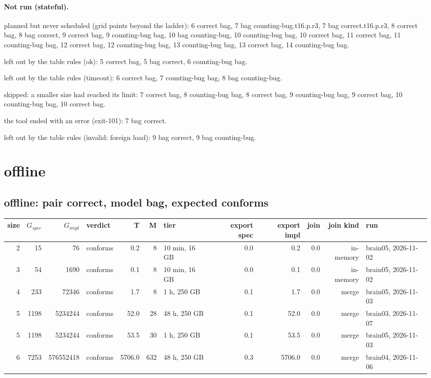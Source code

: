 \documentclass[10pt]{article}
\begin{document}
\paragraph{Not run (stateful).}
planned but never scheduled (grid points beyond the ladder): 6 correct bag, 7 bag counting-bug.t16.p.r3, 7 bag correct.t16.p.r3, 8 correct bag, 8 bag correct, 9 correct bag, 9 counting-bug bag, 10 bag counting-bug, 10 counting-bug bag, 10 correct bag, 11 correct bag, 11 counting-bug bag, 12 correct bag, 12 counting-bug bag, 13 counting-bug bag, 13 correct bag, 14 counting-bug bag.\par
left out by the table rules (ok): 5 correct bag, 5 bag correct, 6 counting-bug bag.\par
left out by the table rules (timeout): 6 correct bag, 7 counting-bug bag, 8 bag counting-bug.\par
skipped: a smaller size had reached its limit: 7 correct bag, 8 counting-bug bag, 8 correct bag, 9 counting-bug bag, 9 correct bag, 10 counting-bug bag, 10 correct bag.\par
the tool ended with an error (exit-101): 7 bag correct.\par
left out by the table rules (invalid: foreign load): 9 bag correct, 9 bag counting-bug.\par
\section*{offline}
\subsection*{offline: pair \textsf{correct}, model bag, expected conforms}
\begin{longtable}{@{}rrrlrrlrrrrl@{}}
\toprule
size & $G_{\mathit{spec}}$ & $G_{\mathit{impl}}$ & verdict & T & M & tier & export spec & export impl & join & join kind & run \\
\midrule
\endhead
\color{red} 2 & 15 & 76 & conforms & 0.2 & 8 & 10 min, 16 GB & 0.0 & 0.2 & 0.0 & in-memory & brain05, 2026-11-02 \\
\color{red} 3 & 54 & 1690 & conforms & 0.1 & 8 & 10 min, 16 GB & 0.0 & 0.1 & 0.0 & in-memory & brain05, 2026-11-02 \\
\color{blue} 4 & 233 & 72346 & conforms & 1.7 & 8 & 1 h, 250 GB & 0.1 & 1.7 & 0.0 & merge & brain05, 2026-11-03 \\
\color{blue} 5 & 1198 & 5234244 & conforms & 52.0 & 28 & 48 h, 250 GB & 0.1 & 52.0 & 0.0 & merge & brain03, 2026-11-07 \\
\color{blue} 5 & 1198 & 5234244 & conforms & 53.5 & 30 & 1 h, 250 GB & 0.1 & 53.5 & 0.0 & merge & brain05, 2026-11-03 \\
\color{blue} 6 & 7253 & 576552418 & conforms & 5706.0 & 632 & 48 h, 250 GB & 0.3 & 5706.0 & 0.0 & merge & brain04, 2026-11-06 \\
\bottomrule
\end{longtable}
\end{document}
